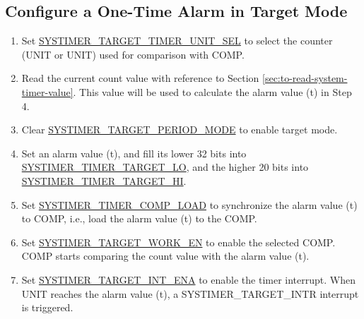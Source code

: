 \documentclass[main\_\_EN.tex]{subfiles}
\begin{document}
\subsection{Configure a One-Time Alarm in Target Mode}
\begin{enumerate}
    \item Set \hyperref[fielddesc:SYSTIMERTARGET0TIMERUNITSEL]{SYSTIMER\_TARGET\_TIMER\_UNIT\_SEL} to select the counter (UNIT or UNIT) used for comparison with COMP.
    \item Read the current count value with reference to Section \ref{sec:to-read-system-timer-value}. This value will be used to calculate the alarm value (t) in Step 4.
    \item Clear \hyperref[fielddesc:SYSTIMERTARGET0PERIODMODE]{SYSTIMER\_TARGET\_PERIOD\_MODE} to enable target mode.
    \item Set an alarm value (t), and fill its lower 32 bits into \hyperref[fielddesc:SYSTIMERTIMERTARGET0LO]{SYSTIMER\_TIMER\_TARGET\_LO}, and the higher 20 bits into \hyperref[fielddesc:SYSTIMERTIMERTARGET0HI]{SYSTIMER\_TIMER\_TARGET\_HI}.
    \item Set \hyperref[fielddesc:SYSTIMERTIMERCOMP0LOAD]{SYSTIMER\_TIMER\_COMP\_LOAD} to synchronize the alarm value (t) to COMP, i.e., load the alarm value (t) to the COMP.
    \item Set \hyperref[fielddesc:SYSTIMERTARGET0WORKEN]{SYSTIMER\_TARGET\_WORK\_EN} to enable the selected COMP. COMP starts comparing the count value with the alarm value (t).
    \item Set \hyperref[fielddesc:SYSTIMERTARGET0INTENA]{SYSTIMER\_TARGET\_INT\_ENA} to enable the timer interrupt. When UNIT reaches the alarm value (t), a SYSTIMER\_TARGET\_INTR interrupt is triggered.
\end{enumerate}
\end{document}
